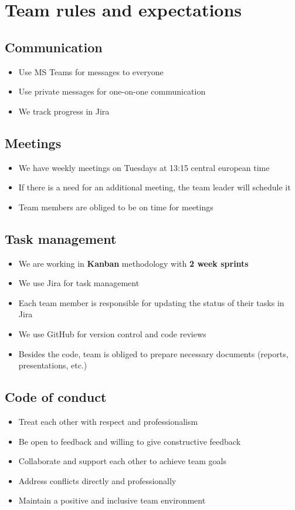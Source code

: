 \documentclass[12pt]{article}
\begin{document}
\section{Team rules and expectations}
\subsection{Communication}
\begin{itemize}
    \item Use MS Teams for messages to everyone
    \item Use private messages for one-on-one communication
    \item We track progress in Jira
\end{itemize}
\subsection{Meetings}
\begin{itemize}
    \item We have weekly meetings on Tuesdays at 13:15 central european time
    \item If there is a need for an additional meeting, the team leader will schedule it
    \item Team members are obliged to be on time for meetings
\end{itemize}
\subsection{Task management}
\begin{itemize}
    \item We are working in \textbf{Kanban} methodology with \textbf{2 week sprints}
    \item We use Jira for task management
    \item Each team member is responsible for updating the status of their tasks in Jira
    \item We use GitHub for version control and code reviews
    \item Besides the code, team is obliged to prepare necessary documents (reports, presentations, etc.)
\end{itemize}
\subsection{Code of conduct}
\begin{itemize}
    \item Treat each other with respect and professionalism
    \item Be open to feedback and willing to give constructive feedback
    \item Collaborate and support each other to achieve team goals
    \item Address conflicts directly and professionally
    \item Maintain a positive and inclusive team environment
\end{itemize}
\end{document}
